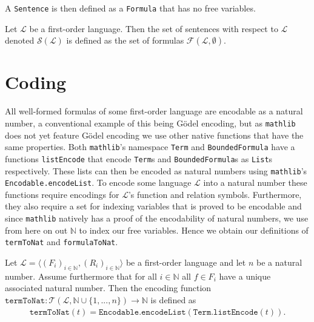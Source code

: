 A \texttt{Sentence} is then defined as a \texttt{Formula} that has no free variables.

\begin{definition}\label{def:FO-Sentence}
  \leanok
    Let $\mathcal{L}$ be a first-order language. Then the set of sentences with respect to $\mathcal{L}$ denoted $\mathcal{S}(\mathcal{L})$ is defined as the set of formulas $\mathcal{F}(\mathcal{L},\emptyset)$.
\end{definition}

\section{Coding}\label{subsec:coding}
All well-formed formulas of some first-order language are encodable as a natural number, a conventional example of this being Gödel encoding, but as \texttt{mathlib} does not yet feature Gödel encoding we use other native functions that have the same properties. Both \texttt{mathlib}'s namespace \texttt{Term} and \texttt{BoundedFormula} have a functions \texttt{listEncode} that encode \texttt{Term}s and \texttt{BoundedFormula}s as \texttt{List}s respectively. These lists can then be encoded as natural numbers using \texttt{mathlib}'s \texttt{Encodable.encodeList}. To encode some language $\mathcal{L}$ into a natural number these functions require encodings for $\mathcal{L}$'s function and relation symbols. Furthermore, they also require a set for indexing variables that is proved to be encodable and since \texttt{mathlib} natively has a proof of the encodability of natural numbers, we use from here on out $\mathbb{N}$ to index our free variables. Hence we obtain our definitions of \texttt{termToNat} and \texttt{formulaToNat}.

\begin{definition}\label{def:FV-Term-Enc}
  \leanok
    Let $\mathcal{L} = \langle (F_i)_{i \in \mathbb{N}}, (R_i)_{i \in \mathbb{N}} \rangle$ be a first-order language and let $n$ be a natural number. Assume furthermore that for all $i \in \mathbb{N}$ all $f \in F_i$ have a unique associated natural number. Then the encoding function $\texttt{termToNat} : \mathcal{T}(\mathcal{L},\mathbb{N} \cup \{1,...,n\}) \to \mathbb{N}$ is defined as 
    \begin{align*}  
        \texttt{termToNat}(t) = \texttt{Encodable.encodeList}(\texttt{Term.listEncode}(t)).
    \end{align*}
\end{definition}

